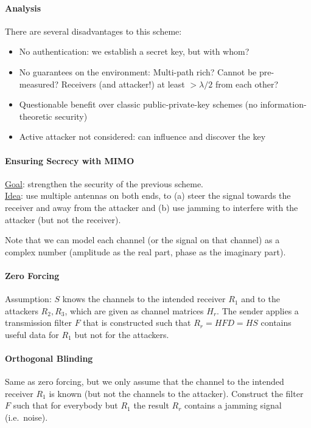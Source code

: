 \paragraph{Analysis}
There are several disadvantages to this scheme:
\begin{itemize}
	\item No authentication: we establish a secret key, but with whom?
	\item No guarantees on the environment:
	Multi-path rich? Cannot be pre-measured? Receivers (and attacker!) at least $> \lambda / 2$ from each other?
	\item Questionable benefit over classic public-private-key schemes (no information-theoretic security)
	\item Active attacker not considered: can influence and discover the key
\end{itemize}

\paragraph{Ensuring Secrecy with MIMO}
\underline{Goal}: strengthen the security of the previous scheme.
\\
\underline{Idea}: use multiple antennas on both ends, to
(a) steer the signal towards the receiver and away from the attacker and
(b) use jamming to interfere with the attacker (but not the receiver).

Note that we can model each channel (or the signal on that channel) as a complex number (amplitude as the real part, phase as the imaginary part).

\paragraph{Zero Forcing}
Assumption: $S$ knows the channels to the intended receiver $R_1$ and to the attackers $R_2, R_3$, which are given as channel matrices $H_r$.
The sender applies a transmission filter $F$ that is constructed such that $R_r = H F D = H S$ contains useful data for $R_1$ but not for the attackers.

\paragraph{Orthogonal Blinding}
Same as zero forcing, but we only assume that the channel to the intended receiver $R_1$ is known (but not the channels to the attacker).
Construct the filter $F$ such that for everybody but $R_1$ the result $R_r$ contains a jamming signal (i.e.\ noise).


